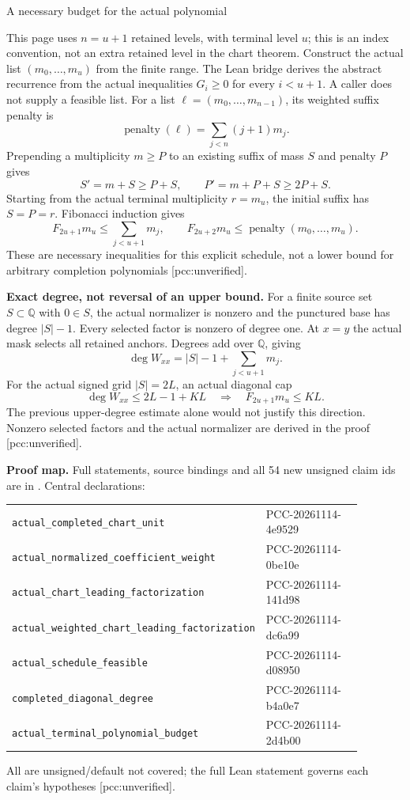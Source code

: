 \documentclass[10pt]{article}
\begin{document}
\newpage
\begin{center}{\Large A necessary budget for the actual polynomial}\end{center}
This page uses $n=u+1$ retained levels, with terminal level $u$; this is an
index convention, not an extra retained level in the chart theorem.
Construct the actual list $(m_0,\ldots,m_u)$ from the finite range. The
Lean bridge derives the abstract recurrence from the actual inequalities
$G_i\ge0$ for every $i<u+1$. A caller does not supply a feasible list.
For a list $\ell=(m_0,\ldots,m_{n-1})$, its weighted suffix penalty is
\[
 \operatorname{penalty}(\ell)=\sum_{j<n}(j+1)m_j.
\]
Prepending a multiplicity $m\ge P$ to an existing suffix of mass $S$ and
penalty $P$ gives
\[
 S'=m+S\ge P+S,\qquad P'=m+P+S\ge2P+S.
\]
Starting from the actual terminal multiplicity $r=m_u$, the initial suffix
has $S=P=r$. Fibonacci induction gives
\[
 F_{2u+1}m_u\le\sum_{j<u+1}m_j,\qquad
 F_{2u+2}m_u\le\operatorname{penalty}(m_0,\ldots,m_u).
\]
These are necessary inequalities for this explicit schedule, not a
lower bound for arbitrary completion polynomials [pcc:unverified].

\textbf{Exact degree, not reversal of an upper bound.}
For a finite source set $S\subset\mathbb Q$ with $0\in S$, the actual
normalizer is nonzero and the punctured base has degree $|S|-1$.
Every selected factor is nonzero of degree one. At $x=y$ the actual mask
selects all retained anchors. Degrees add over $\mathbb Q$, giving
\[
 \deg W_{xx}=|S|-1+\sum_{j<u+1}m_j.
\]
For the actual signed grid $|S|=2L$, an actual diagonal cap
\[
 \deg W_{xx}\le 2L-1+KL
 \quad\Longrightarrow\quad F_{2u+1}m_u\le KL.
\]
The previous upper-degree estimate alone would not justify this direction.
Nonzero selected factors and the actual normalizer are derived in the proof
[pcc:unverified].

\textbf{Proof map.} Full statements, source bindings and all 54 new unsigned
claim ids are in . Central declarations:
\begin{center}\small
\begin{tabular}{p{0.59\linewidth}p{0.29\linewidth}}
\texttt{actual\_completed\_chart\_unit} & PCC-20261114-4e9529\\
\texttt{actual\_normalized\_coefficient\_weight} & PCC-20261114-0be10e\\
\texttt{actual\_chart\_leading\_factorization} & PCC-20261114-141d98\\
\texttt{actual\_weighted\_chart\_leading\_factorization} & PCC-20261114-dc6a99\\
\texttt{actual\_schedule\_feasible} & PCC-20261114-d08950\\
\texttt{completed\_diagonal\_degree} & PCC-20261114-b4a0e7\\
\texttt{actual\_terminal\_polynomial\_budget} & PCC-20261114-2d4b00
\end{tabular}
\end{center}
All are unsigned/default not covered; the full Lean statement governs each
claim's hypotheses [pcc:unverified].
\end{document}
